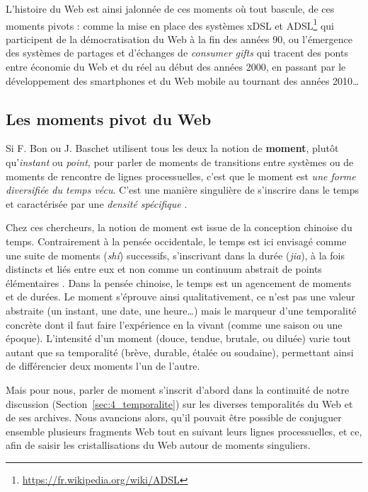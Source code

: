 \documentclass[symmetric,justified,marginals=raggedouter]{tufte-book}
\begin{document}
L'histoire du Web est ainsi jalonnée de ces moments où tout bascule, de ces moments pivots : comme la mise en place des systèmes xDSL et ADSL\footnote{\RaggedOuter \url{https://fr.wikipedia.org/wiki/ADSL}} qui participent de la démocratisation du Web à la fin des années 90, ou l'émergence des systèmes de partages et d'échanges de \textit{consumer gifts} \citep{giesler_consumer_2006} qui tracent des ponts entre économie du Web et du réel au début des années 2000, en passant par le développement des smartphones et du Web mobile au tournant des années 2010\ldots{} 

\subsection{Les moments pivot du Web}

\noindent Si F. Bon ou J. Baschet utilisent tous les deux la notion de \textbf{moment}, plutôt qu'\textit{instant} ou \textit{point}, pour parler de moments de transitions entre systèmes ou de moments de rencontre de lignes processuelles, c'est que le moment est \og\textit{une forme diversifiée du temps vécu}\fg{}. C'est une manière singulière de s'inscrire dans le temps et caractérisée par une \og\textit{densité spécifique}\fg{} \citep[p.186]{baschet_defaire_2018}. 

Chez ces chercheurs, la notion de moment est issue de la conception chinoise du temps. Contrairement à la pensée occidentale, le temps est ici envisagé comme une suite de moments (\textit{shí}) successifs, s'inscrivant dans la durée (\textit{jia}), à la fois distincts et liés entre eux \citep{chen_cerner_2011} et non comme un continuum abstrait de points élémentaires \citep[livre XI, chap. XV, 20]{saint_augustin_confessions_421}. Dans la pensée chinoise, le temps est un agencement de moments et de durées. Le moment s'éprouve ainsi qualitativement, ce n'est pas une valeur abstraite (un instant, une date, une heure\ldots{}) mais le marqueur d'une temporalité concrète dont il faut faire l'expérience en la vivant (comme une saison ou une époque). L'intensité d'un moment (douce, tendue, brutale, ou diluée) varie tout autant que sa temporalité (brève, durable, étalée ou soudaine), permettant ainsi de différencier deux moments l'un de l'autre.

Mais pour nous, parler de moment s'inscrit d'abord dans la continuité de notre discussion (Section~\ref{sec:4_temporalite}) sur les diverses temporalités du Web et de ses archives. Nous avancions alors, qu'il pouvait être possible de conjuguer ensemble plusieurs fragments Web tout en suivant leurs lignes processuelles, et ce, afin de saisir les cristallisations du Web autour de moments singuliers. 
\end{document}
